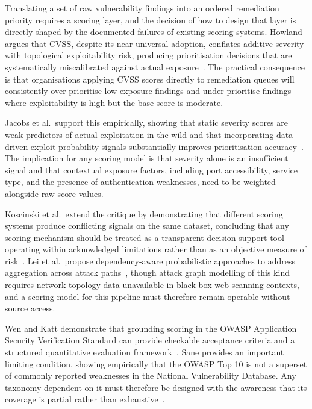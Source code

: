 \documentclass[12pt, a4paper, oneside]{report}
\begin{document}
Translating a set of raw vulnerability findings into an ordered
remediation priority requires a scoring layer, and the decision of how
to design that layer is directly shaped by the documented failures of
existing scoring systems. Howland argues that CVSS, despite its
near-universal adoption, conflates additive severity with topological
exploitability risk, producing prioritisation decisions that are
systematically miscalibrated against actual
exposure~\cite{howland2023}. The practical consequence is that
organisations applying CVSS scores directly to remediation queues will
consistently over-prioritise low-exposure findings and under-prioritise
findings where exploitability is high but the base score is moderate.

Jacobs et al.\ support this empirically, showing that static severity
scores are weak predictors of actual exploitation in the wild and that
incorporating data-driven exploit probability signals substantially
improves prioritisation accuracy~\cite{jacobs2023}. The implication for
any scoring model is that severity alone is an insufficient signal and
that contextual exposure factors, including port accessibility, service
type, and the presence of authentication weaknesses, need to be weighted
alongside raw score values.

Koscinski et al.\ extend the critique by demonstrating that different
scoring systems produce conflicting signals on the same dataset,
concluding that any scoring mechanism should be treated as a transparent
decision-support tool operating within acknowledged limitations rather
than as an objective measure of risk~\cite{koscinski2025}. Lei et al.\
propose dependency-aware probabilistic approaches to address aggregation
across attack paths~\cite{lei2024}, though attack graph modelling of
this kind requires network topology data unavailable in black-box web
scanning contexts, and a scoring model for this pipeline must therefore
remain operable without source access.

Wen and Katt demonstrate that grounding scoring in the OWASP Application
Security Verification Standard can provide checkable acceptance criteria
and a structured quantitative evaluation framework~\cite{wen2023}.
Sane provides an important limiting condition, showing empirically that
the OWASP Top 10 is not a superset of commonly reported weaknesses in
the National Vulnerability Database. Any taxonomy dependent on it must
therefore be designed with the awareness that its coverage is partial
rather than exhaustive~\cite{sane2020}.
\end{document}
